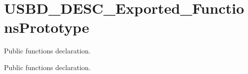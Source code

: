 \hypertarget{group__USBD__DESC__Exported__FunctionsPrototype}{}\section{U\+S\+B\+D\+\_\+\+D\+E\+S\+C\+\_\+\+Exported\+\_\+\+Functions\+Prototype}
\label{group__USBD__DESC__Exported__FunctionsPrototype}


Public functions declaration.  


Public functions declaration. 

